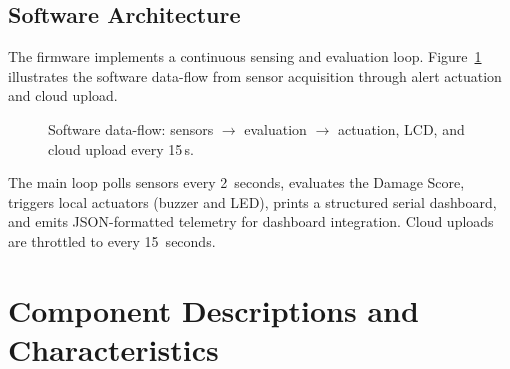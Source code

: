\documentclass[12pt, a4paper]{article}
\begin{document}
\subsection{Software Architecture}

The firmware implements a continuous sensing and evaluation loop. Figure~\ref{fig:sw_arch} illustrates the software data-flow from sensor acquisition through alert actuation and cloud upload.

\begin{figure}[H]
\centering
{}
\caption{Software data-flow: sensors $\to$ evaluation $\to$ actuation, LCD, and cloud upload every 15\,s.}
\label{fig:sw_arch}
\end{figure}

The main loop polls sensors every 2~seconds, evaluates the Damage Score, triggers local actuators (buzzer and LED), prints a structured serial dashboard, and emits JSON-formatted telemetry for dashboard integration. Cloud uploads are throttled to every 15~seconds.

\section{Component Descriptions and Characteristics}
\label{sec:components}
\end{document}
